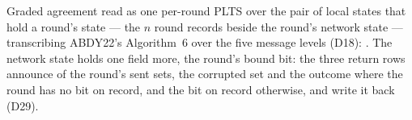 \begin{definition}
  \label{def:aba-gbca-implementation}
  \leanok
  Graded agreement read as one per-round PLTS over the pair of local states that hold a round's state --- the $n$ round records beside the round's network state --- transcribing ABDY22's Algorithm~6 over the five message levels (D18): .
  The network state holds one field more, the round's bound bit: the three return rows announce  of the round's sent sets, the corrupted set and the outcome where the round has no bit on record, and the bit on record otherwise, and write it back (D29).
\end{definition}
